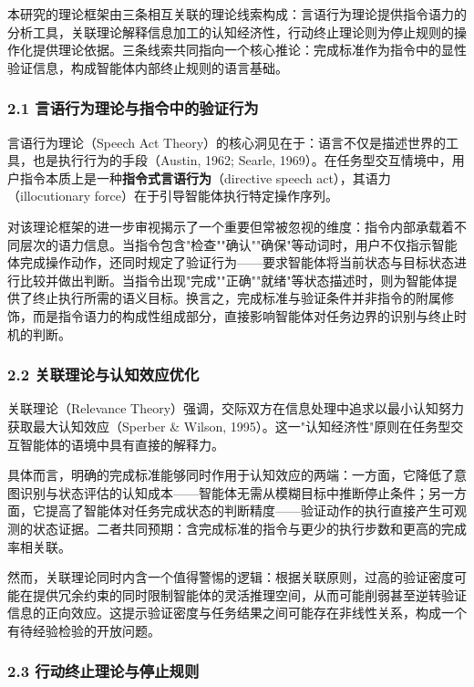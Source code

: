 \documentclass[12pt,a4paper,openany,oneside]{ctexrep}
\begin{document}
本研究的理论框架由三条相互关联的理论线索构成：言语行为理论提供指令语力的分析工具，关联理论解释信息加工的认知经济性，行动终止理论则为停止规则的操作化提供理论依据。三条线索共同指向一个核心推论：完成标准作为指令中的显性验证信息，构成智能体内部终止规则的语言基础。

\subsubsection{2.1 言语行为理论与指令中的验证行为}


言语行为理论（Speech Act Theory）的核心洞见在于：语言不仅是描述世界的工具，也是执行行为的手段（Austin, 1962; Searle, 1969）。在任务型交互情境中，用户指令本质上是一种\textbf{指令式言语行为}（directive speech act），其语力（illocutionary force）在于引导智能体执行特定操作序列。

对该理论框架的进一步审视揭示了一个重要但常被忽视的维度：指令内部承载着不同层次的语力信息。当指令包含"检查""确认""确保"等动词时，用户不仅指示智能体完成操作动作，还同时规定了验证行为——要求智能体将当前状态与目标状态进行比较并做出判断。当指令出现"完成""正确""就绪"等状态描述时，则为智能体提供了终止执行所需的语义目标。换言之，完成标准与验证条件并非指令的附属修饰，而是指令语力的构成性组成部分，直接影响智能体对任务边界的识别与终止时机的判断。

\subsubsection{2.2 关联理论与认知效应优化}


关联理论（Relevance Theory）强调，交际双方在信息处理中追求以最小认知努力获取最大认知效应（Sperber \& Wilson, 1995）。这一"认知经济性"原则在任务型交互智能体的语境中具有直接的解释力。

具体而言，明确的完成标准能够同时作用于认知效应的两端：一方面，它降低了意图识别与状态评估的认知成本——智能体无需从模糊目标中推断停止条件；另一方面，它提高了智能体对任务完成状态的判断精度——验证动作的执行直接产生可观测的状态证据。二者共同预期：含完成标准的指令与更少的执行步数和更高的完成率相关联。

然而，关联理论同时内含一个值得警惕的逻辑：根据关联原则，过高的验证密度可能在提供冗余约束的同时限制智能体的灵活推理空间，从而可能削弱甚至逆转验证信息的正向效应。这提示验证密度与任务结果之间可能存在非线性关系，构成一个有待经验检验的开放问题。

\subsubsection{2.3 行动终止理论与停止规则}
\end{document}
